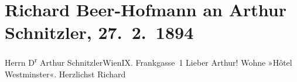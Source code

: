 

         
         \renewcommand{\erwaehntePersonen}{Personen: Richard Beer-Hofmann}
         \renewcommand{\erwaehnteOrte}{Orte: Berlin, Frankgasse 1, Hotel Westminster, IX., Alsergrund, Wien}
         \renewcommand{\erwaehnteWerke}{}
               \section[Richard Beer-Hofmann an Arthur Schnitzler, 27. 2. 1894]{ Richard Beer-Hofmann an Arthur Schnitzler, 27. 2. 1894}\nopagebreak{}\rehead{ }\begin{ledgroupsized}[t]{13cm}\normalsize\beginnumbering \toendnotes[C]{\smallbreak\pagebreak[2]} 
\pstart{}{\pb}Herrn D\textsuperscript{r} Arthur Schnitzler\pend{}\pstart{}Wien\pend{}\pstart{}IX. Frankgasse 1\pend{}{\bigskip}\pstart
           \noindent{}{\pb}Lieber Arthur! Wohne »Hôtel
                  Westminster«. Herzlichst\pend
           \pstart \spacefill\mbox{Richard}\pend{}
         
         \endnumbering{}\end{ledgroupsized}  \newcommand{\dateiname}{L00302}\newcommand{\titel}{Richard Beer-Hofmann an Arthur Schnitzler, 27. 2. 1894}\newcommand{\editorInnen}{Martin Anton Müller und Gerd-Hermann Susen}
      